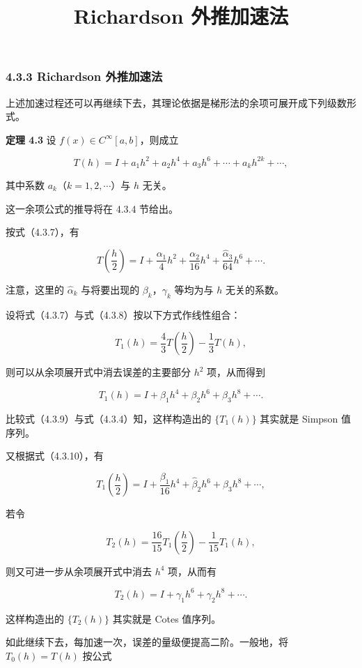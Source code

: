 \documentclass[
  10pt,
  fontset=fandol]{ctexart}
\title{Richardson 外推加速法}
\author{}
\date{}
\begin{document}
\maketitle

\subsubsection{4.3.3 Richardson 外推加速法}\label{richardson-ux5916ux63a8ux52a0ux901fux6cd5}

上述加速过程还可以再继续下去，其理论依据是梯形法的余项可展开成下列级数形式。

\textbf{定理 4.3} 设 \(f(x)\in C^\infty[a,b]\)，则成立

\[
T(h)=I+a_1h^2+a_2h^4+a_3h^6+\cdots+a_kh^{2k}+\cdots,
\tag{4.3.7}
\]

其中系数 \(a_k\)（\(k=1,2,\cdots\)）与 \(h\) 无关。

这一余项公式的推导将在 4.3.4 节给出。

按式（4.3.7），有

\[
T\left(\frac h2\right)=I+\frac{\alpha_1}{4}h^2+\frac{\alpha_2}{16}h^4+\frac{\hat\alpha_3}{64}h^6+\cdots.
\tag{4.3.8}
\]

注意，这里的 \(\hat\alpha_k\) 与将要出现的 \(\beta_k\)，\(\gamma_k\) 等均为与 \(h\) 无关的系数。

设将式（4.3.7）与式（4.3.8）按以下方式作线性组合：

\[
T_1(h)=\frac43T\left(\frac h2\right)-\frac13T(h),
\tag{4.3.9}
\]

则可以从余项展开式中消去误差的主要部分 \(h^2\) 项，从而得到

\[
T_1(h)=I+\beta_1h^4+\beta_2h^6+\beta_3h^8+\cdots.
\tag{4.3.10}
\]

比较式（4.3.9）与式（4.3.4）知，这样构造出的 \(\{T_1(h)\}\) 其实就是 Simpson 值序列。

又根据式（4.3.10），有

\[
T_1\left(\frac h2\right)=I+\frac{\beta_1}{16}h^4+\hat\beta_2h^6+\beta_3h^8+\cdots,
\]

若令

\[
T_2(h)=\frac{16}{15}T_1\left(\frac h2\right)-\frac1{15}T_1(h),
\]

则又可进一步从余项展开式中消去 \(h^4\) 项，从而有

\[
T_2(h)=I+\gamma_1h^6+\gamma_2h^8+\cdots.
\]

这样构造出的 \(\{T_2(h)\}\) 其实就是 Cotes 值序列。

如此继续下去，每加速一次，误差的量级便提高二阶。一般地，将 \(T_0(h)=T(h)\) 按公式
\end{document}
